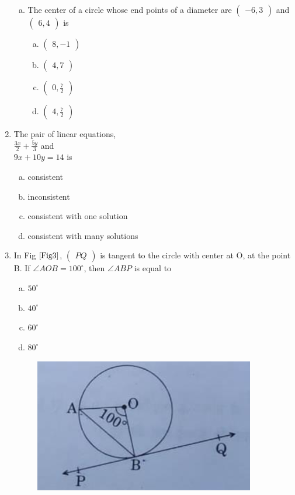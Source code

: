 \documentclass[journal,12pt,twocolumn]{IEEEtran}
\newcommand{\myvec}[1]{\ensuremath{\begin{pmatrix}#1\end{pmatrix}}}
\begin{document}
\begin{enumerate}[label=1.\arabic*]
\begin{enumerate}[a)]
\item The center of a circle whose end points of a diameter are $\myvec{-6, 3}$ and $\myvec{6,4}$ is
\begin{enumerate}[(a)]
\item $\myvec{8,-1}$\\
\item $\myvec{4,7}$\\ 
\item $\myvec{0,\frac{7}{2}}$\\
\item $\myvec{4,\frac{7}{2}}$\\
\end{enumerate}
\end{enumerate}

\item The pair of linear equations,\\
$\frac{3x}{2} + \frac{5y}{3}$ and\\
$9x + 10y = 14$ is\\
\begin{enumerate}[(a)]
\item consistent\\
\item inconsistent\\ 
\item consistent with one solution\\
\item consistent with many solutions\\
\end{enumerate}

\item In Fig $\ref{Fig3}$, $\myvec{PQ}$ is tangent to the circle with center at O, at the point B. If $\angle{AOB} = 100^\circ$, then $\angle{ABP}$ is equal to\\
\begin{enumerate}[(a)]
\item $50^\circ$\\
\item $40^\circ$\\ 
\item $60^\circ$\\
\item $80^\circ$\\
\end{enumerate}

\begin{figure}[h!]
    \centering
    \includegraphics[width=0.5\columnwidth,center]{Fig3.png}
	\caption{}
	\label{Fig3}
 \end{figure}
 \end{enumerate}
\end{document}
